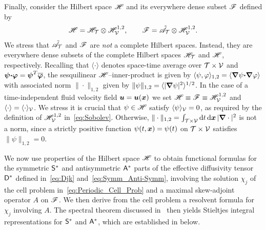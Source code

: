 \documentclass[amsa]{ipart}
\begin{document}
Finally, consider the Hilbert
space $\mathscr{H}$ and its everywhere dense subset $\mathscr{F}$ defined by
%
\begin{align}\label{eq:Function_Space_Scalar}
  \Hs=\Hs_{\Tc}\otimes\Hs^{1,2}_{\Vc}, \qquad
  \Fs=\tilde{\As}_{\Tc}\otimes\Hs^{1,2}_{\Vc}.
\end{align}
%
We stress that $\tilde{\mathscr{A}}_{\mathcal{T}}$ and $\mathscr{F}$ are \emph{not} a
complete Hilbert spaces. Instead, they are everywhere dense subsets of
the complete Hilbert spaces $\mathscr{H}_{\mathcal{T}}$ and $\mathscr{H}$, respectively.
Recalling that $\langle\cdot\rangle$ denotes space-time average over $\mathcal{T}\times\mathcal{V}$ and
$\boldsymbol{\psi}\mbox{\boldmath${\cdot}$}\boldsymbol{\varphi}=\boldsymbol{\psi}^T\overline{\boldsymbol{\varphi}}$, 
the sesquilinear  
$\mathscr{H}$--inner-product is given by $\langle\psi,\varphi\rangle_{1,2}=\left\langle\mbox{\boldmath${\nabla}$} \psi\mbox{\boldmath${\cdot}$}\mbox{\boldmath${\nabla}$} \varphi \right\rangle$ with associated norm
$\|\cdot\|_{1,2}$ given by $\|\psi\|_{1,2}= \langle|\mbox{\boldmath${\nabla}$} \psi|^2\rangle^{1/2}$.
In the case of a 
time-independent fluid velocity field $\boldsymbol{u}=\boldsymbol{u}(\boldsymbol{x})$ we set 
$\mathscr{H}\equiv\mathscr{F}\equiv\mathscr{H}^{1,2}_{\mathcal{V}}$ and $\langle\cdot\rangle=\langle\cdot\rangle_{\mathcal{V}}$.  We stress  it is
crucial that $\psi\in\mathscr{H}$ satisfy $\langle\psi\rangle_{\mathcal{V}}=0$, as required by the
definition of $\mathscr{H}^{1,2}_{\mathcal{V}}$ in~\eqref{eq:Sobolev}. Otherwise,
$\|\cdot\|_{1,2}=\int_{\mathcal{T}\times\mathcal{V}}\mathrm{d} t\,\mathrm{d}\boldsymbol{x}\,|\mbox{\boldmath${\nabla}$}\cdot|^2$ is not a norm,
since a strictly positive function $\psi(t,\boldsymbol{x})=\psi(t)$ on $\mathcal{T}\times\mathcal{V}$
satisfies $\|\psi\|_{1,2}=0$.    





We now use properties of the Hilbert space $\mathscr{H}$ to obtain
functional formulas for the symmetric $\mathsf{S}^*$ and antisymmetric
$\mathsf{A}^*$ parts of the effective diffusivity tensor $\mathsf{D}^*$ defined
in~\eqref{eq:Djk} and~\eqref{eq:Symm_Anti-Symm}, involving the 
solution $\chi_j$ of the cell problem in~\eqref{eq:Periodic_Cell_Prob}
and a maximal skew-adjoint 
operator $A$ on $\mathscr{F}$. We then derive from the cell 
problem a resolvent formula for $\chi_j$ involving $A$. The spectral
theorem discussed in~ 
then yields Stieltjes integral representations for
$\mathsf{S}^*$ and $\mathsf{A}^*$, which are established in
 below. 
\end{document}
